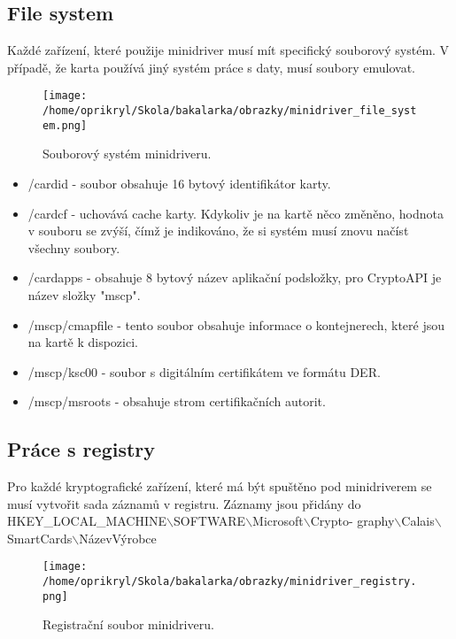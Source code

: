 \documentclass[]{fithesis3}
\begin{document}
		\subsection{File system}
		Každé zařízení, které použije minidriver musí mít specifický souborový systém. V případě, že 		karta používá jiný systém práce s daty, musí soubory emulovat.

		\begin{figure}[!ht]
  			\begin{minipage}{1.00\textwidth}
    				\texttt{[image: /home/oprikryl/Skola/bakalarka/obrazky/minidriver\_file\_system.png]}
  			\end{minipage}
 			\caption{Souborový systém minidriveru.}
  			\label{fig:Souborový systém minidriveru.}
		\end{figure}	

		\begin{itemize}
			\item /cardid - soubor obsahuje 16 bytový identifikátor karty.
			\item /cardcf - uchovává cache karty. Kdykoliv je na kartě něco změněno, hodnota v 				souboru se zvýší, čímž je indikováno, že si systém musí znovu načíst všechny soubory.
			\item /cardapps - obsahuje 8 bytový název aplikační podsložky, pro CryptoAPI je název 			složky "mscp".
			\item /mscp/cmapfile - tento soubor obsahuje informace o kontejnerech, které jsou na 				kartě k dispozici.
			\item /mscp/ksc00 - soubor s digitálním certifikátem ve formátu DER.
			\item /mscp/msroots - obsahuje strom certifikačních autorit.
		\end{itemize}

		\subsection{Práce s registry}
		
		Pro každé kryptografické zařízení, které má být spuštěno pod minidriverem se musí 				vytvořit sada záznamů v registru. Záznamy jsou přidány do HKEY\_LOCAL\_MACHINE$\backslash$SOFTWARE$\backslash$Microsoft$\backslash$Crypto- graphy$\backslash$Calais$\backslash$SmartCards$\backslash$NázevVýrobce

		\begin{figure}[!ht]
  			\begin{minipage}{1.00\textwidth}
    				\texttt{[image: /home/oprikryl/Skola/bakalarka/obrazky/minidriver\_registry.png]}
  			\end{minipage}
 			\caption{Registrační soubor minidriveru.}
  			\label{fig:Registrační soubor minidriveru.}
		\end{figure}	
\end{document}
